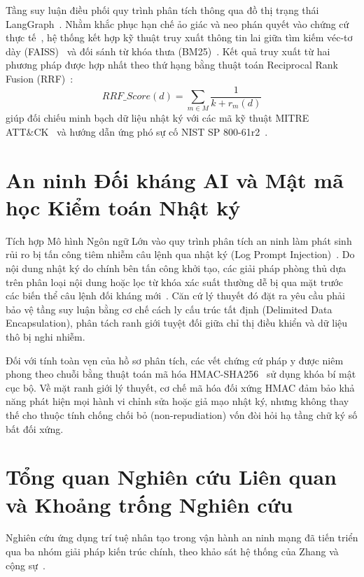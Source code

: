Tầng suy luận điều phối quy trình phân tích thông qua đồ thị trạng thái LangGraph~\cite{langgraph2024}. Nhằm khắc phục hạn chế ảo giác và neo phán quyết vào chứng cứ thực tế~\cite{rag2020}, hệ thống kết hợp kỹ thuật truy xuất thông tin lai giữa tìm kiếm véc-tơ dày (FAISS)~\cite{faiss2019} và đối sánh từ khóa thưa (BM25)~\cite{bm25_2009}. Kết quả truy xuất từ hai phương pháp được hợp nhất theo thứ hạng bằng thuật toán Reciprocal Rank Fusion (RRF)~\cite{rrf2009}:
\begin{equation}
\label{eq:rrf}
    RRF\_Score(d) = \sum_{m \in M} \frac{1}{k + r_m(d)}
\end{equation}
giúp đối chiếu minh bạch dữ liệu nhật ký với các mã kỹ thuật MITRE ATT\&CK~\cite{strom2018mitre} và hướng dẫn ứng phó sự cố NIST SP 800-61r2~\cite{nist80061}.

\section{An ninh Đối kháng AI và Mật mã học Kiểm toán Nhật ký}
\label{sec:adversarial_theory}

Tích hợp Mô hình Ngôn ngữ Lớn vào quy trình phân tích an ninh làm phát sinh rủi ro bị tấn công tiêm nhiễm câu lệnh qua nhật ký (Log Prompt Injection)~\cite{promptinjection2023, owasp_llm2025}. Do nội dung nhật ký do chính bên tấn công khởi tạo, các giải pháp phòng thủ dựa trên phân loại nội dung hoặc lọc từ khóa xác suất thường dễ bị qua mặt trước các biến thể câu lệnh đối kháng mới~\cite{watchtower2026}. Căn cứ lý thuyết đó đặt ra yêu cầu phải bảo vệ tầng suy luận bằng cơ chế cách ly cấu trúc tất định (Delimited Data Encapsulation), phân tách ranh giới tuyệt đối giữa chỉ thị điều khiển và dữ liệu thô bị nghi nhiễm.

Đối với tính toàn vẹn của hồ sơ phân tích, các vết chứng cứ pháp y được niêm phong theo chuỗi bằng thuật toán mã hóa HMAC-SHA256~\cite{hmac1997} sử dụng khóa bí mật cục bộ. Về mặt ranh giới lý thuyết, cơ chế mã hóa đối xứng HMAC đảm bảo khả năng phát hiện mọi hành vi chỉnh sửa hoặc giả mạo nhật ký, nhưng không thay thế cho thuộc tính chống chối bỏ (non-repudiation) vốn đòi hỏi hạ tầng chữ ký số bất đối xứng.

\section{Tổng quan Nghiên cứu Liên quan và Khoảng trống Nghiên cứu}

Nghiên cứu ứng dụng trí tuệ nhân tạo trong vận hành an ninh mạng đã tiến triển qua ba nhóm giải pháp kiến trúc chính, theo khảo sát hệ thống của Zhang và cộng sự~\cite{llmsec_survey2025}.

